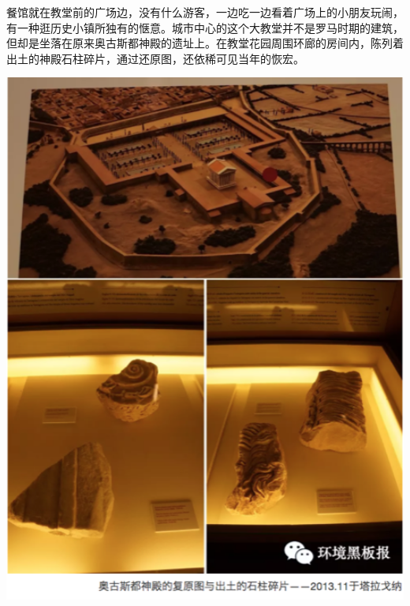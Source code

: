 \documentclass[
]{book}
\begin{document}
餐馆就在教堂前的广场边，没有什么游客，一边吃一边看着广场上的小朋友玩闹，有一种逛历史小镇所独有的惬意。城市中心的这个大教堂并不是罗马时期的建筑，但却是坐落在原来奥古斯都神殿的遗址上。在教堂花园周围环廊的房间内，陈列着出土的神殿石柱碎片，通过还原图，还依稀可见当年的恢宏。

\includegraphics[width=6.35in]{images/xt37}
\end{document}
